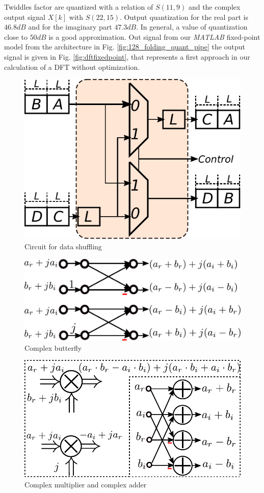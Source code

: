 \documentclass[journal,comsoc]{IEEEtran}
\begin{document}
Twiddles factor are quantized with a relation of $S(11,9)$ and the complex output signal $X[k]$ with $S(22,15)$. Output quantization for the real part is $46.8dB$ and for the imaginary part $47.3dB$. In general, a value of quantization close to $50dB$ is a good approximation. Out signal from our \textit{MATLAB} fixed-point model from the architecture in Fig. \ref{fig:128_folding_quant_pipe} the output signal is given in Fig. \ref{fig:dftfixedpoint}, that represents a first approach in our calculation of a DFT without optimization.

\begin{figure} 
	\centering
	\includegraphics[width=0.42\linewidth]{Diagramas/miSeccionFiguras/Shift.pdf}
	\caption{Circuit for data shuffling}
	\label{fig:shift}
\end{figure}
\begin{figure} 
	\centering
	\includegraphics[width=0.65\linewidth]{Diagramas/miSeccionFiguras/ButterComplejo.pdf}
	\caption{Complex butterfly }
	\label{fig:buttercomplejo}
\end{figure}
\begin{figure} 
	\centering
	\includegraphics[width=0.65\linewidth]{Diagramas/miSeccionFiguras/SumMult.pdf}
	\caption{Complex multiplier and complex adder}
	\label{fig:summult}
\end{figure}
\end{document}
